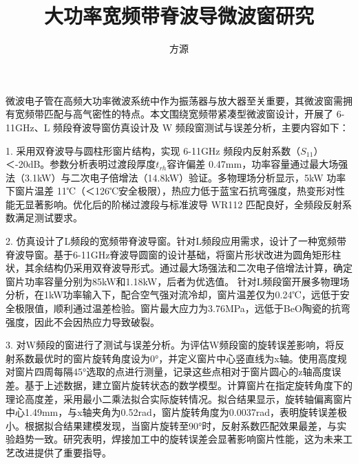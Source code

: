 \documentclass[master]{thesis-uestc}
\title{大功率宽频带脊波导微波窗研究}{Research on High-Power Broadband Ridge Waveguide Microwave Window} %
\author{方源}{Fang Yuan} %
\begin{document}
\makecover %
\originalitydeclaration %
\begin{chineseabstract}
    微波电子管在高频大功率微波系统中作为振荡器与放大器至关重要，其微波窗需拥有宽频带匹配与高气密性的特点。本文围绕宽频带紧凑型微波窗设计，开展了 6-11GHz、L 频段脊波导窗仿真设计及 W 频段窗测试与误差分析，主要内容如下：

    1. 采用双脊波导与圆柱形窗片结构，实现 6-11GHz 频段内反射系数（\(S_{11}\)）＜-20dB。参数分析表明过渡段厚度\(t_{rh}\)容许偏差 0.47mm，功率容量通过最大场强法（3.1kW）与二次电子倍增法（14.8kW）验证。多物理场分析显示，5kW 功率下窗片温差 11℃（＜126℃安全极限），热应力低于蓝宝石抗弯强度，热变形对性能无显著影响。优化后的阶梯过渡段与标准波导 WR112 匹配良好，全频段反射系数满足测试要求。

    2. 仿真设计了L频段的宽频带脊波导窗。针对L频段应用需求，设计了一种宽频带脊波导窗。基于6-11GHz脊波导圆窗的设计基础，将窗片形状改进为圆角矩形柱状，其余结构仍采用双脊波导形式。通过最大场强法和二次电子倍增法计算，确定窗片功率容量分别为85kW和1.18kW，后者为优选值。
    针对L频段窗开展多物理场分析，在1kW功率输入下，配合空气强对流冷却，窗片温差仅为0.24℃，远低于安全极限值，顺利通过温差检验。窗片最大应力为3.76MPa，远低于BeO陶瓷的抗弯强度，因此不会因热应力导致破裂。

    3. 对W频段的窗进行了测试与误差分析。为评估W频段窗的旋转误差影响，将反射系数最优时的窗片旋转角度设为0°，并定义窗片中心竖直线为x轴。使用高度规对窗片四周每隔45°选取的点进行测量，记录这些点相对于窗片圆心的z轴高度误差。基于上述数据，建立窗片旋转状态的数学模型。计算窗片在指定旋转角度下的理论高度差，采用最小二乘法拟合实际旋转情况。拟合结果显示，旋转轴偏离窗片中心1.49mm，与x轴夹角为0.52rad，窗片旋转角度为0.0037rad，表明旋转误差极小。根据拟合结果建模发现，当窗片旋转至90°时，反射系数匹配效果最差，与实验趋势一致。研究表明，焊接加工中的旋转误差会显著影响窗片性能，这为未来工艺改进提供了重要指导。

\end{chineseabstract}
\end{document}
